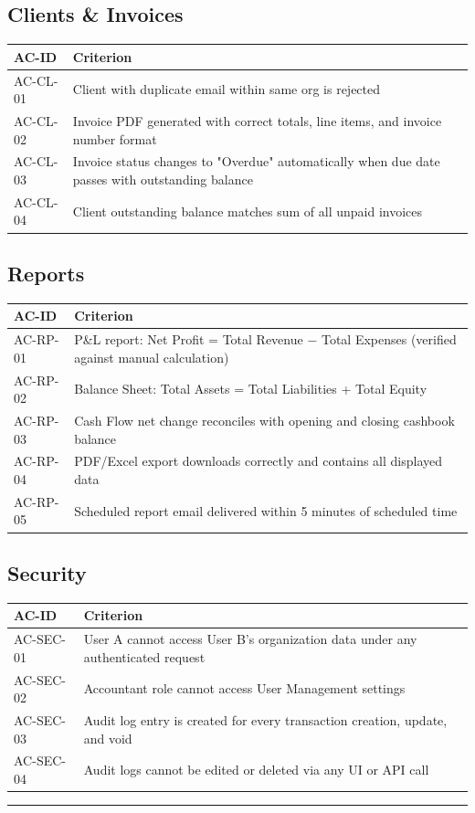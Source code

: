 \documentclass[journal, a4paper, onecolumn, 12pt]{IEEEtran}
\begin{document}
\subsection{Clients \& Invoices}
\begin{longtable}{|p{}|p{}|}
\hline
AC-ID & Criterion \\ \hline
\hline
AC-CL-01 & Client with duplicate email within same org is rejected \\ \hline
AC-CL-02 & Invoice PDF generated with correct totals, line items, and invoice number format \\ \hline
AC-CL-03 & Invoice status changes to "Overdue" automatically when due date passes with outstanding balance \\ \hline
AC-CL-04 & Client outstanding balance matches sum of all unpaid invoices \\ \hline
\end{longtable}
\subsection{Reports}
\begin{longtable}{|p{}|p{}|}
\hline
AC-ID & Criterion \\ \hline
\hline
AC-RP-01 & P\&L report: Net Profit = Total Revenue − Total Expenses (verified against manual calculation) \\ \hline
AC-RP-02 & Balance Sheet: Total Assets = Total Liabilities + Total Equity \\ \hline
AC-RP-03 & Cash Flow net change reconciles with opening and closing cashbook balance \\ \hline
AC-RP-04 & PDF/Excel export downloads correctly and contains all displayed data \\ \hline
AC-RP-05 & Scheduled report email delivered within 5 minutes of scheduled time \\ \hline
\end{longtable}
\subsection{Security}
\begin{longtable}{|p{}|p{}|}
\hline
AC-ID & Criterion \\ \hline
\hline
AC-SEC-01 & User A cannot access User B's organization data under any authenticated request \\ \hline
AC-SEC-02 & Accountant role cannot access User Management settings \\ \hline
AC-SEC-03 & Audit log entry is created for every transaction creation, update, and void \\ \hline
AC-SEC-04 & Audit logs cannot be edited or deleted via any UI or API call \\ \hline
\end{longtable}
\vspace{1em}\hrule\vspace{1em}
\end{document}
